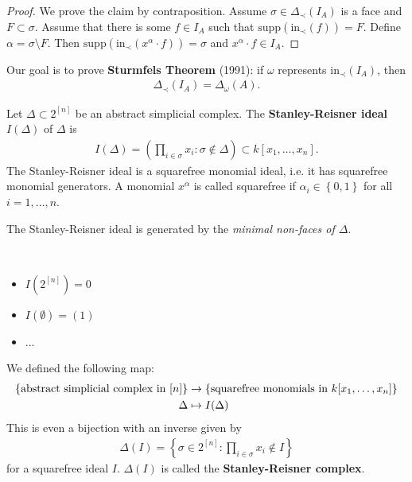 \documentclass[a4paper, 11pt]{article}
\begin{document}
\begin{proof}
  We prove the claim by contraposition.   Assume \( \sigma \in \Delta_\prec(I_A) \) is a face and \( F \subset \sigma \). Assume that there is some \( f \in I_A \) such that \( \mathrm{supp}(\mathrm{in}_\prec(f)) = F \). Define \( \alpha = \sigma \setminus F \). Then \( \mathrm{supp}(\mathrm{in}_\prec(x^\alpha \cdot f)) = \sigma \) and \( x^\alpha \cdot f \in I_A \).
\end{proof}

Our goal is to prove \textbf{Sturmfels Theorem} (1991): if \( \omega \) represents \( \mathrm{in}_\prec(I_A) \), then 
\begin{align*}
  \Delta_\prec(I_A) = \Delta_\omega(A).
\end{align*}

\begin{defi}
  Let \( \Delta \subset 2^{[n]} \) be an abstract simplicial complex. The \textbf{Stanley-Reisner ideal} \( I(\Delta) \) of \( \Delta \) is 
  \begin{align*}
    I(\Delta) = \left( \prod_{i \in \sigma} x_i : \sigma \notin \Delta \right) \subset k [x_1, \dots, x_n].
  \end{align*}
  The Stanley-Reisner ideal is a squarefree monomial ideal, i.e. it has squarefree monomial generators. A monomial \( x^\alpha \) is called squarefree if \( \alpha_i \in \left\{ 0,1 \right\} \) for all \( i=1, \dots, n \).
\end{defi}

\begin{remark}
  The Stanley-Reisner ideal is generated by the \emph{minimal non-faces of \( \Delta \)}.
\end{remark}

\begin{eg}\(  \)
\begin{itemize}
  \item \( I(2^{[n]}) = 0 \)
  \item \( I(\emptyset) = (1) \)
  \item ...
\end{itemize}
\end{eg}

\begin{remark}
  We defined the following map:
  \begin{align*}
    \left\{ \text{abstract simplicial complex in \( [n] \)} \right\} &\to \left\{ \text{squarefree monomials in \( k[x_1, \dots, x_n] \)} \right\}\\
    \Delta &\mapsto I(\Delta)
  \end{align*}
  This is even a bijection with an inverse given by 
  \begin{align*}
    \Delta(I) = \left\{ \sigma \in 2^{[n]} : \prod_{i \in \sigma} x_i \notin I  \right\}
  \end{align*}
  for a squarefree ideal \( I \). 
  \( \Delta(I) \) is called the \textbf{Stanley-Reisner complex}.
\end{remark}
\end{document}
